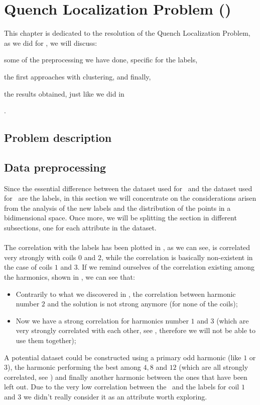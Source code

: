 \chapter{Quench Localization Problem (\qlp)}
\label{chp:qlp}
This chapter is dedicated to the resolution of the Quench Localization Problem, as we did for \qrp,
we will discuss:
\begin{inparaenum}[(i)]
	\item some of the preprocessing we have done, specific for the labels,
	\item the first approaches with clustering, and finally,
	\item the results obtained, just like we did in 
\end{inparaenum}.
\section{Problem description}
\section{Data preprocessing}
\label{sec:qlp-preprocessing}
Since the essential difference between the dataset used for \qlp\ and the dataset used for \qrp\,
are the labels, in this section we will concentrate on the considerations arisen from the analysis
of the new labels and the distribution of the points in a bidimensional space. Once more, we will be
splitting the section in different subsections, one for each attribute in the dataset.

\subsubsection{\an}
The correlation with the labels has been plotted in , as we can see, \an is
correlated very strongly with coils $0$ and $2$, while the correlation is basically non-existent in the
case of coils $1$ and $3$. If we remind ourselves of the correlation existing among the harmonics,
shown in , we can see that:
\begin{itemize}
	\item Contrarily to what we discovered in , the correlation
	      between harmonic number $2$ and the solution is not strong anymore (for none of the
	      coils);
	\item Now we have a strong correlation for harmonics number $1$ and $3$ (which are very
	      strongly correlated with each other, see , therefore we will not be able
	      to use them together);
\end{itemize}
A potential dataset could be constructed using a primary odd harmonic (like $1$ or $3$), the
harmonic performing the best among $4, 8$ and $12$ (which are all strongly correlated, see
) and finally another harmonic between the ones that have been left out. Due to
the very low correlation between the \an\ and the labels for coil $1$ and $3$ we didn't really
consider it as an attribute worth exploring.

